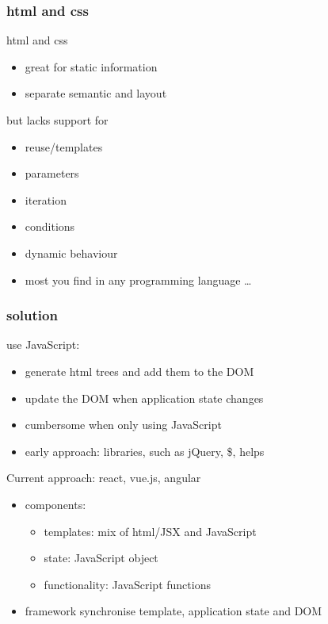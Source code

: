 \begin{frame}[fragile] \frametitle{html and css}
html and css
\begin{itemize}
  \item great for static information
  \item separate semantic and layout
\end{itemize}
but lacks support for
\begin{itemize}
  \item reuse/templates
  \item parameters
  \item iteration
  \item conditions
  \item dynamic behaviour
  \item most you find in any programming language \ldots
\end{itemize}
\end{frame}

\begin{frame}[fragile] \frametitle{solution}
use JavaScript:
\begin{itemize}
  \item generate html trees and add them to the DOM
  \item update the DOM when application state changes
  \item cumbersome when only using JavaScript
  \item early approach: libraries, such as jQuery, \$, helps
\end{itemize}
\vspace{4mm}
Current approach: react, vue.js, angular
\begin{itemize}
  \item components:
  \begin{itemize}
    \item templates: mix of html/JSX and JavaScript
    \item state: JavaScript object
    \item functionality: JavaScript functions
  \end{itemize}
  \item framework synchronise template, application state and DOM
\end{itemize}
\end{frame}


